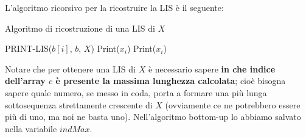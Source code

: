 \documentclass[12pt]{article}
\begin{document}
L'algoritmo ricorsivo per la ricostruire la LIS è il seguente: \newline
\begin{algorithm}[H] 
    \caption{Algoritmo di ricostruzione di una LIS di $X$}
    \DontPrintSemicolon
     {
         {
            PRINT-LIS($b[i]$, $b$, $X$) \;
            Print($x_i$) \;
        } {
            Print($x_i$)
        }
    }
\end{algorithm} \noindent
Notare che per ottenere una LIS di $X$ è necessario sapere \textbf{in che indice dell'array $c$ è presente la massima lunghezza calcolata}; cioè bisogna
sapere quale numero, se messo in coda, porta a formare una più lunga sottosequenza strettamente crescente di $X$ (ovviamente ce ne potrebbero essere più di uno, ma noi
ne basta uno). Nell'algoritmo bottom-up lo abbiamo salvato nella variabile $indMax$.
\end{document}
